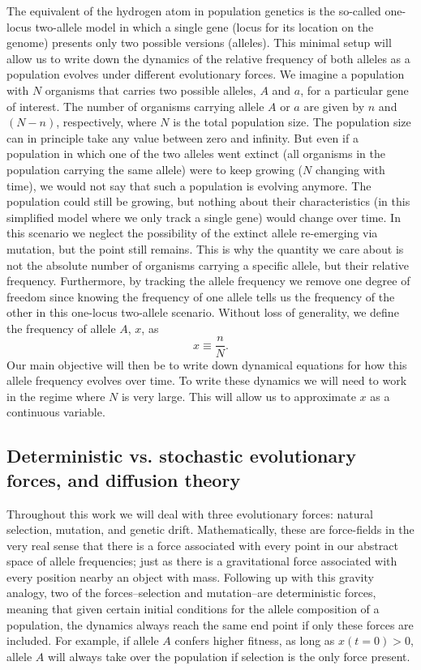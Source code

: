 The equivalent of the hydrogen atom in population genetics is the so-called
one-locus two-allele model in which a single gene (locus for its location on the
genome) presents only two possible versions (alleles). This minimal setup will
allow us to write down the dynamics of the relative frequency of both alleles as
a population evolves under different evolutionary forces. We imagine a
population with $N$ organisms that carries two possible alleles, $A$ and $a$,
for a particular gene of interest. The number of organisms carrying allele $A$
or $a$ are given by $n$ and $(N - n)$, respectively, where $N$ is the total
population size. The population size can in principle take any value between
zero and infinity. But even if a population in which one of the two alleles went
extinct (all organisms in the population carrying the same allele) were to keep
growing ($N$ changing with time), we would not say that such a population is
evolving anymore. The population could still be growing, but nothing about their
characteristics (in this simplified model where we only track a single gene)
would change over time. In this scenario we neglect the possibility of the
extinct allele re-emerging via mutation, but the point still remains. This is
why the quantity we care about is not the absolute number of organisms carrying
a specific allele, but their relative frequency. Furthermore, by tracking the
allele frequency we remove one degree of freedom since knowing the frequency of
one allele tells us the frequency of the other in this one-locus two-allele
scenario. Without loss of generality, we define the frequency of allele $A$,
$x$, as
\begin{equation}
    x \equiv \frac{n}{N}.
\end{equation}
Our main objective will then be to write down dynamical equations for how this
allele frequency evolves over time. To write these dynamics we will need to work
in the regime where $N$ is very large. This will allow us to approximate $x$ as
a continuous variable.

\subsection{Deterministic vs. stochastic evolutionary forces, and diffusion 
theory}

Throughout this work we will deal with three evolutionary forces: natural
selection, mutation, and genetic drift. Mathematically, these are force-fields
in the very real sense that there is a force associated with every point in our
abstract space of allele frequencies; just as there is a gravitational force
associated with every position nearby an object with mass. Following up with
this gravity analogy, two of the forces--selection and mutation--are
deterministic forces, meaning that given certain initial conditions for the
allele composition of a population, the dynamics always reach the same end point
if only these forces are included. For example, if allele $A$ confers higher
fitness, as long as $x(t = 0) > 0$, allele $A$ will always take over the
population if selection is the only force present.


